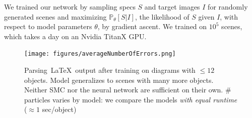 \documentclass{article}
\newcommand{\probability}{\mathds{P}} %
\theoremstyle{definition}
\begin{document}
We trained our network by sampling specs $S$ and target
images $I$ for randomly generated scenes
and maximizing $\probability_\theta[S|I]$,
 the likelihood of $S$ given $I$, with respect to
  model parameters $\theta$, by gradient ascent.
We trained on $10^5$ scenes, which takes a day on an Nvidia TitanX GPU.


\begin{figure}
  \vspace{-0.25cm}
  \centering
      \texttt{[image: figures/averageNumberOfErrors.png]}
      \caption{Parsing~\LaTeX~output after training on diagrams with $\leq 12$ objects. Model generalizes to scenes with many more objects. Neither SMC nor the neural network are sufficient on their own. \# particles varies by model: we compare the models \emph{with equal runtime} ($\approx 1$ sec/object)}\label{syntheticResults}%
\end{figure}
\end{document}
